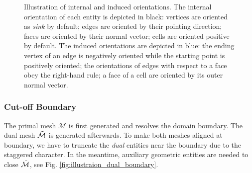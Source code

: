 \documentclass{article}
\begin{document}
\begin{figure}
\begin{minipage}{0.2\textwidth}
    \end{minipage}
    \begin{minipage}{0.2\textwidth}
    \end{minipage}
    \caption{Illustration of internal and induced orientations. The internal orientation of each entity is depicted in black: vertices are oriented as \emph{sink} by default; edges are oriented by their pointing direction; faces are oriented by their normal vector; cells are oriented positive by default. The induced orientations are depicted in blue: the ending vertex of an edge is negatively oriented while the starting point is positively oriented; the orientations of edges with respect to a face obey the right-hand rule; a face of a cell are oriented by its outer normal vector. }
    \label{fig:orientation}
\end{figure}

\subsubsection{Cut-off Boundary}
The primal mesh $\mathcal{M}$ is first generated and resolves the domain boundary. The dual mesh $\Tilde{\mathcal{M}}$ is generated afterwards. To make both meshes aligned at boundary, we have to truncate the \emph{dual} entities near the boundary due to the staggered character. In the meantime, auxiliary geometric entities are needed to close $\Tilde{\mathcal{M}}$, see Fig. \ref{fig:illustraion_dual_boundary}.
\end{document}
